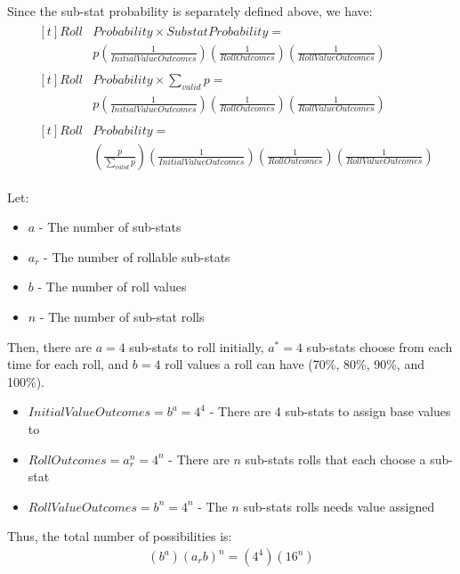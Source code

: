\documentclass[12pt]{article}
\begin{document}
Since the sub-stat probability is separately defined above, we have:
\begin{align*}
	&\begin{aligned}[t]Roll&Probability \times SubstatProbability = \\
	&p\left(\frac{1}{InitialValueOutcomes}\right)\left(\frac{1}{RollOutcomes}\right)\left(\frac{1}{RollValueOutcomes}\right)\end{aligned} \\[12pt]
	&\begin{aligned}[t]Roll&Probability \times \sum_{valid} p = \\
	&p\left(\frac{1}{InitialValueOutcomes}\right)\left(\frac{1}{RollOutcomes}\right)\left(\frac{1}{RollValueOutcomes}\right)\end{aligned} \\[12pt]
	&\begin{aligned}[t]Roll&Probability = \\
	&\left(\frac{p}{\sum_{valid} p}\right)\left(\frac{1}{InitialValueOutcomes}\right)\left(\frac{1}{RollOutcomes}\right)\left(\frac{1}{RollValueOutcomes}\right)\end{aligned}
\end{align*}

\pagebreak
Let:
\begin{itemize}[]
	\item $a$ - The number of sub-stats
	\item $a_{r}$ - The number of rollable sub-stats
	\item $b$ - The number of roll values
	\item $n$ - The number of sub-stat rolls
\end{itemize}

Then, there are $a = 4$ sub-stats to roll initially, $a^* = 4$ sub-stats choose from each time for each roll, and $b = 4$ roll values a roll can have (70\%, 80\%, 90\%, and 100\%).
\begin{itemize}[]
	\item $InitialValueOutcomes = b^a = 4^4$ - There are 4 sub-stats to assign base values to
	\item $RollOutcomes = a_{r}^n = 4^n$ - There are $n$ sub-stats rolls that each choose a sub-stat
	\item $RollValueOutcomes = b^n = 4^n$ - The $n$ sub-stats rolls needs value assigned
\end{itemize}

Thus, the total number of possibilities is:
\begin{align*}
	(b^a)(a_{r}b)^n = (4^4)(16^n)
\end{align*}
\end{document}
